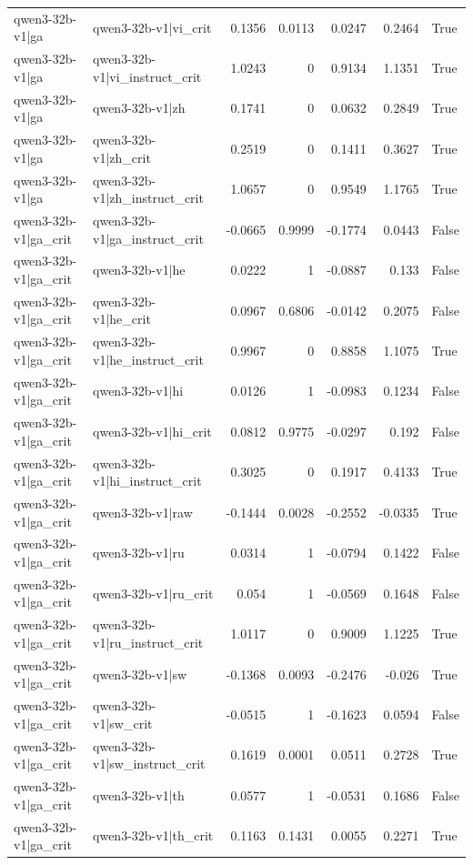 \begin{table}
\begin{tabular}{l l r r r r l}
qwen3-32b-v1|ga & qwen3-32b-v1|vi_crit & 0.1356 & 0.0113 & 0.0247 & 0.2464 & True \\
qwen3-32b-v1|ga & qwen3-32b-v1|vi_instruct_crit & 1.0243 & 0 & 0.9134 & 1.1351 & True \\
qwen3-32b-v1|ga & qwen3-32b-v1|zh & 0.1741 & 0 & 0.0632 & 0.2849 & True \\
qwen3-32b-v1|ga & qwen3-32b-v1|zh_crit & 0.2519 & 0 & 0.1411 & 0.3627 & True \\
qwen3-32b-v1|ga & qwen3-32b-v1|zh_instruct_crit & 1.0657 & 0 & 0.9549 & 1.1765 & True \\
qwen3-32b-v1|ga_crit & qwen3-32b-v1|ga_instruct_crit & -0.0665 & 0.9999 & -0.1774 & 0.0443 & False \\
qwen3-32b-v1|ga_crit & qwen3-32b-v1|he & 0.0222 & 1 & -0.0887 & 0.133 & False \\
qwen3-32b-v1|ga_crit & qwen3-32b-v1|he_crit & 0.0967 & 0.6806 & -0.0142 & 0.2075 & False \\
qwen3-32b-v1|ga_crit & qwen3-32b-v1|he_instruct_crit & 0.9967 & 0 & 0.8858 & 1.1075 & True \\
qwen3-32b-v1|ga_crit & qwen3-32b-v1|hi & 0.0126 & 1 & -0.0983 & 0.1234 & False \\
qwen3-32b-v1|ga_crit & qwen3-32b-v1|hi_crit & 0.0812 & 0.9775 & -0.0297 & 0.192 & False \\
qwen3-32b-v1|ga_crit & qwen3-32b-v1|hi_instruct_crit & 0.3025 & 0 & 0.1917 & 0.4133 & True \\
qwen3-32b-v1|ga_crit & qwen3-32b-v1|raw & -0.1444 & 0.0028 & -0.2552 & -0.0335 & True \\
qwen3-32b-v1|ga_crit & qwen3-32b-v1|ru & 0.0314 & 1 & -0.0794 & 0.1422 & False \\
qwen3-32b-v1|ga_crit & qwen3-32b-v1|ru_crit & 0.054 & 1 & -0.0569 & 0.1648 & False \\
qwen3-32b-v1|ga_crit & qwen3-32b-v1|ru_instruct_crit & 1.0117 & 0 & 0.9009 & 1.1225 & True \\
qwen3-32b-v1|ga_crit & qwen3-32b-v1|sw & -0.1368 & 0.0093 & -0.2476 & -0.026 & True \\
qwen3-32b-v1|ga_crit & qwen3-32b-v1|sw_crit & -0.0515 & 1 & -0.1623 & 0.0594 & False \\
qwen3-32b-v1|ga_crit & qwen3-32b-v1|sw_instruct_crit & 0.1619 & 0.0001 & 0.0511 & 0.2728 & True \\
qwen3-32b-v1|ga_crit & qwen3-32b-v1|th & 0.0577 & 1 & -0.0531 & 0.1686 & False \\
qwen3-32b-v1|ga_crit & qwen3-32b-v1|th_crit & 0.1163 & 0.1431 & 0.0055 & 0.2271 & True \\

\end{tabular}
\end{table}
